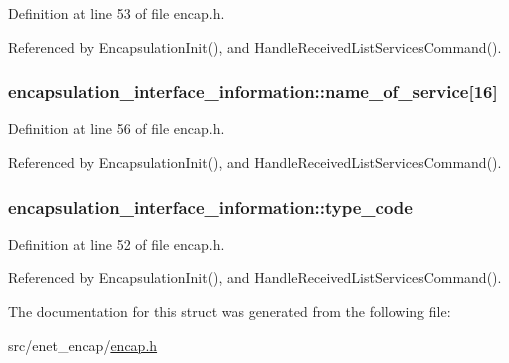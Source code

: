 \-Definition at line 53 of file encap.\-h.



\-Referenced by \-Encapsulation\-Init(), and \-Handle\-Received\-List\-Services\-Command().

\hypertarget{structencapsulation__interface__information_adf21ea364f65cb0d7988bf094bc1c471}{
\subsubsection[{name\-\_\-of\-\_\-service}]{ {\bf encapsulation\-\_\-interface\-\_\-information\-::name\-\_\-of\-\_\-service}\mbox{[}16\mbox{]}}}\label{d0/d6e/structencapsulation__interface__information_adf21ea364f65cb0d7988bf094bc1c471}


\-Definition at line 56 of file encap.\-h.



\-Referenced by \-Encapsulation\-Init(), and \-Handle\-Received\-List\-Services\-Command().

\hypertarget{structencapsulation__interface__information_af37bc735455105810324d3caf470bcf0}{
\subsubsection[{type\-\_\-code}]{ {\bf encapsulation\-\_\-interface\-\_\-information\-::type\-\_\-code}}}\label{d0/d6e/structencapsulation__interface__information_af37bc735455105810324d3caf470bcf0}


\-Definition at line 52 of file encap.\-h.



\-Referenced by \-Encapsulation\-Init(), and \-Handle\-Received\-List\-Services\-Command().



\-The documentation for this struct was generated from the following file\-:\begin{DoxyCompactItemize}
\item 
src/enet\-\_\-encap/\hyperlink{encap_8h}{encap.\-h}\end{DoxyCompactItemize}
